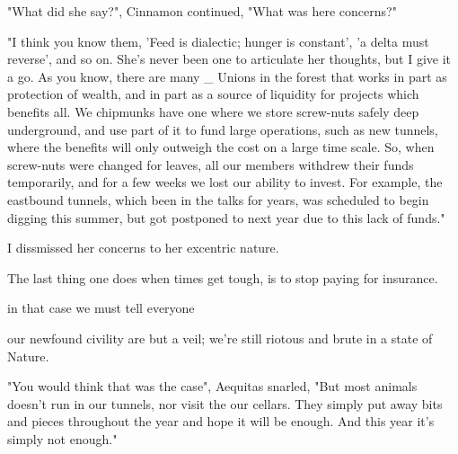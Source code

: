 
"What did she say?", Cinnamon continued, "What was here concerns?"

"I think you know them, 'Feed is dialectic; hunger is constant', 'a delta must reverse', and so on. She's never been one to articulate her thoughts, but I give it a go. As you know, there are many _ Unions in the forest that works in part as protection of wealth, and in part as a source of liquidity for projects which benefits all. We chipmunks have one where we store screw-nuts safely deep underground, and use part of it to fund large operations, such as new tunnels, where the benefits will only outweigh the cost on a large time scale. So, when screw-nuts were changed for leaves, all our members withdrew their funds temporarily, and for a few weeks we lost our ability to invest. For example, the eastbound tunnels, which been in the talks for years, was scheduled to begin digging this summer, but got postponed to next year due to this lack of funds."



I dissmissed her concerns to her excentric nature.

The last thing one does when times get tough, is to stop paying for insurance.

in that case we must tell everyone

our newfound civility are but a veil; we're still riotous and brute in a state of Nature.




"You would think that was the case", Aequitas snarled, "But most animals doesn't run in our tunnels, nor visit the our cellars. They simply put away bits and pieces throughout the year and hope it will be enough. And this year it's simply not enough."

